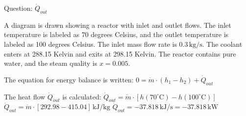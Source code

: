 Question: \( \dot{Q}_{out} \)  

A diagram is drawn showing a reactor with inlet and outlet flows. The inlet temperature is labeled as 70 degrees Celsius, and the outlet temperature is labeled as 100 degrees Celsius. The inlet mass flow rate is \( 0.3 \, \text{kg/s} \). The coolant enters at 288.15 Kelvin and exits at 298.15 Kelvin. The reactor contains pure water, and the steam quality is \( x = 0.005 \).  

The equation for energy balance is written:  
\( 0 = \dot{m} \cdot (h_1 - h_2) + \dot{Q}_{out} \)  

The heat flow \( \dot{Q}_{out} \) is calculated:  
\( \dot{Q}_{out} = \dot{m} \cdot [h(70^\circ \text{C}) - h(100^\circ \text{C})] \)  
\( \dot{Q}_{out} = \dot{m} \cdot [292.98 - 415.04] \, \text{kJ/kg} \)  
\( \dot{Q}_{out} = -37.818 \, \text{kJ/s} = -37.818 \, \text{kW} \)